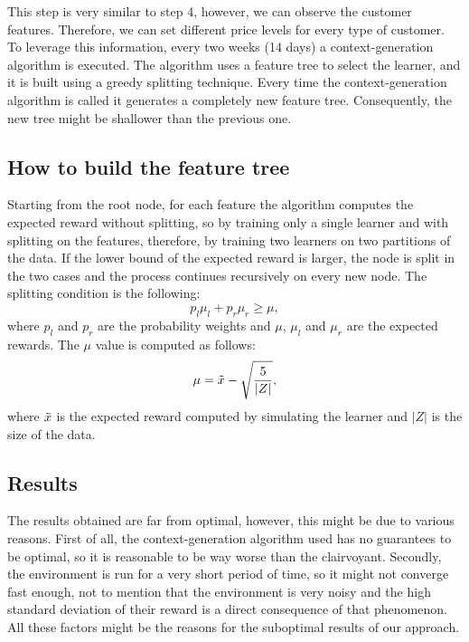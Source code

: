 This step is very similar to step 4, however, we can observe the customer features.
Therefore, we can set different price levels for every type of customer.
To leverage this information, every two weeks (14 days) a context-generation algorithm is executed.
The algorithm uses a feature tree to select the learner, and it is built using a greedy splitting technique.
Every time the context-generation algorithm is called it generates a completely new feature tree.
Consequently, the new tree might be shallower than the previous one.

\subsection{How to build the feature tree}
Starting from the root node, for each feature the algorithm computes the expected reward without splitting, so by training only a single learner and with splitting on the features, therefore, by training two learners on two partitions of the data.
If the lower bound of the expected reward is larger, the node is split in the two cases and the process continues recursively on every new node.
The splitting condition is the following:
\begin{equation}
    p_l\mu_l + p_r \mu_r \geq \mu,
\end{equation}
where $p_l$ and $p_r$ are the probability weights and $\mu$, $\mu_l$ and $\mu_r$ are the expected rewards.
The $\mu$ value is computed as follows:
\begin{equation}
    \mu = \Tilde{x} - \sqrt{\frac{5}{|Z|}},
\end{equation}
where $\Tilde{x}$ is the expected reward computed by simulating the learner and $|Z|$ is the size of the data.


\subsection{Results}
The results obtained are far from optimal, however, this might be due to various reasons.
First of all, the context-generation algorithm used has no guarantees to be optimal, so it is reasonable to be way worse than the clairvoyant.
Secondly, the environment is run for a very short period of time, so it might not converge fast enough, not to mention that the environment is very noisy and the high standard deviation of their reward is a direct consequence of that phenomenon.
All these factors might be the reasons for the suboptimal results of our approach.
\newpage

